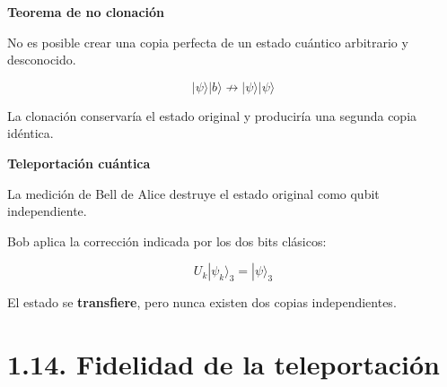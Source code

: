 \documentclass{afitdefense}
\begin{document}
\begin{Center}

\begin{minipage}[c]{0.47\textwidth}
\centering
\small

\textbf{Teorema de no clonación}

\medskip

No es posible crear una copia
perfecta de un estado cuántico
arbitrario y desconocido.

\[
|\psi\rangle|b\rangle
\not\longrightarrow
|\psi\rangle|\psi\rangle
\]

\medskip

La clonación conservaría el estado
original y produciría una
segunda copia idéntica.

\end{minipage}
\hfill
\begin{minipage}[c]{0.47\textwidth}
\centering
\small

\textbf{Teleportación cuántica}

\medskip

La medición de Bell de Alice
destruye el estado original
como qubit independiente.

\medskip

Bob aplica la corrección indicada
por los dos bits clásicos:

\[
\boxed{
U_k|\psi_k\rangle_3=|\psi\rangle_3
}
\]

\medskip

El estado se \textbf{transfiere},
pero nunca existen dos copias
independientes.

\end{minipage}

\end{Center}


\section{1.14. Fidelidad de la teleportación}
\end{document}
